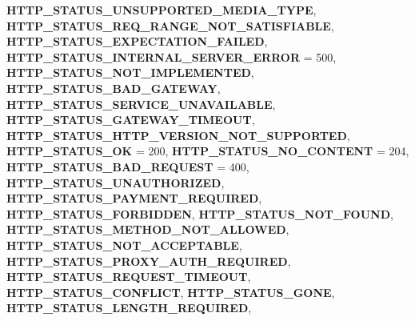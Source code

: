 \begin{DoxyCompactItemize}
{\bfseries H\+T\+T\+P\+\_\+\+S\+T\+A\+T\+U\+S\+\_\+\+U\+N\+S\+U\+P\+P\+O\+R\+T\+E\+D\+\_\+\+M\+E\+D\+I\+A\+\_\+\+T\+Y\+PE}, 
{\bfseries H\+T\+T\+P\+\_\+\+S\+T\+A\+T\+U\+S\+\_\+\+R\+E\+Q\+\_\+\+R\+A\+N\+G\+E\+\_\+\+N\+O\+T\+\_\+\+S\+A\+T\+I\+S\+F\+I\+A\+B\+LE}, 
{\bfseries H\+T\+T\+P\+\_\+\+S\+T\+A\+T\+U\+S\+\_\+\+E\+X\+P\+E\+C\+T\+A\+T\+I\+O\+N\+\_\+\+F\+A\+I\+L\+ED}, 
\newline
{\bfseries H\+T\+T\+P\+\_\+\+S\+T\+A\+T\+U\+S\+\_\+\+I\+N\+T\+E\+R\+N\+A\+L\+\_\+\+S\+E\+R\+V\+E\+R\+\_\+\+E\+R\+R\+OR} = 500, 
{\bfseries H\+T\+T\+P\+\_\+\+S\+T\+A\+T\+U\+S\+\_\+\+N\+O\+T\+\_\+\+I\+M\+P\+L\+E\+M\+E\+N\+T\+ED}, 
{\bfseries H\+T\+T\+P\+\_\+\+S\+T\+A\+T\+U\+S\+\_\+\+B\+A\+D\+\_\+\+G\+A\+T\+E\+W\+AY}, 
{\bfseries H\+T\+T\+P\+\_\+\+S\+T\+A\+T\+U\+S\+\_\+\+S\+E\+R\+V\+I\+C\+E\+\_\+\+U\+N\+A\+V\+A\+I\+L\+A\+B\+LE}, 
\newline
{\bfseries H\+T\+T\+P\+\_\+\+S\+T\+A\+T\+U\+S\+\_\+\+G\+A\+T\+E\+W\+A\+Y\+\_\+\+T\+I\+M\+E\+O\+UT}, 
{\bfseries H\+T\+T\+P\+\_\+\+S\+T\+A\+T\+U\+S\+\_\+\+H\+T\+T\+P\+\_\+\+V\+E\+R\+S\+I\+O\+N\+\_\+\+N\+O\+T\+\_\+\+S\+U\+P\+P\+O\+R\+T\+ED}, 
{\bfseries H\+T\+T\+P\+\_\+\+S\+T\+A\+T\+U\+S\+\_\+\+OK} = 200, 
{\bfseries H\+T\+T\+P\+\_\+\+S\+T\+A\+T\+U\+S\+\_\+\+N\+O\+\_\+\+C\+O\+N\+T\+E\+NT} = 204, 
\newline
{\bfseries H\+T\+T\+P\+\_\+\+S\+T\+A\+T\+U\+S\+\_\+\+B\+A\+D\+\_\+\+R\+E\+Q\+U\+E\+ST} = 400, 
{\bfseries H\+T\+T\+P\+\_\+\+S\+T\+A\+T\+U\+S\+\_\+\+U\+N\+A\+U\+T\+H\+O\+R\+I\+Z\+ED}, 
{\bfseries H\+T\+T\+P\+\_\+\+S\+T\+A\+T\+U\+S\+\_\+\+P\+A\+Y\+M\+E\+N\+T\+\_\+\+R\+E\+Q\+U\+I\+R\+ED}, 
{\bfseries H\+T\+T\+P\+\_\+\+S\+T\+A\+T\+U\+S\+\_\+\+F\+O\+R\+B\+I\+D\+D\+EN}, 
\newline
{\bfseries H\+T\+T\+P\+\_\+\+S\+T\+A\+T\+U\+S\+\_\+\+N\+O\+T\+\_\+\+F\+O\+U\+ND}, 
{\bfseries H\+T\+T\+P\+\_\+\+S\+T\+A\+T\+U\+S\+\_\+\+M\+E\+T\+H\+O\+D\+\_\+\+N\+O\+T\+\_\+\+A\+L\+L\+O\+W\+ED}, 
{\bfseries H\+T\+T\+P\+\_\+\+S\+T\+A\+T\+U\+S\+\_\+\+N\+O\+T\+\_\+\+A\+C\+C\+E\+P\+T\+A\+B\+LE}, 
{\bfseries H\+T\+T\+P\+\_\+\+S\+T\+A\+T\+U\+S\+\_\+\+P\+R\+O\+X\+Y\+\_\+\+A\+U\+T\+H\+\_\+\+R\+E\+Q\+U\+I\+R\+ED}, 
\newline
{\bfseries H\+T\+T\+P\+\_\+\+S\+T\+A\+T\+U\+S\+\_\+\+R\+E\+Q\+U\+E\+S\+T\+\_\+\+T\+I\+M\+E\+O\+UT}, 
{\bfseries H\+T\+T\+P\+\_\+\+S\+T\+A\+T\+U\+S\+\_\+\+C\+O\+N\+F\+L\+I\+CT}, 
{\bfseries H\+T\+T\+P\+\_\+\+S\+T\+A\+T\+U\+S\+\_\+\+G\+O\+NE}, 
{\bfseries H\+T\+T\+P\+\_\+\+S\+T\+A\+T\+U\+S\+\_\+\+L\+E\+N\+G\+T\+H\+\_\+\+R\+E\+Q\+U\+I\+R\+ED}, 
\newline

\end{DoxyCompactItemize}
